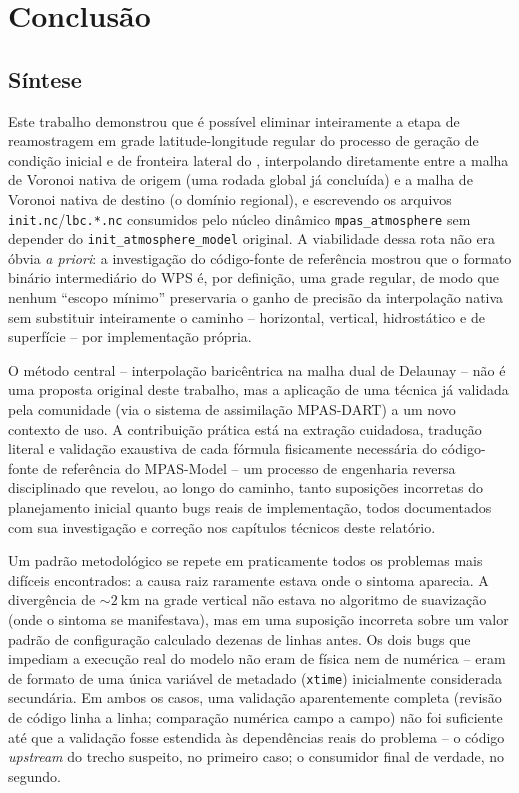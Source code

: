 \chapter{Conclusão}
\label{cap:conclusao}

\section{Síntese}

Este trabalho demonstrou que é possível eliminar inteiramente a etapa de
reamostragem em grade latitude-longitude regular do processo de geração
de condição inicial e de fronteira lateral do \mpasa{}, interpolando
diretamente entre a malha de Voronoi nativa de origem (uma rodada global
já concluída) e a malha de Voronoi nativa de destino (o domínio
regional), e escrevendo os arquivos \texttt{init.nc}/\texttt{lbc.*.nc}
consumidos pelo núcleo dinâmico \texttt{mpas\_atmosphere} sem depender do
\texttt{init\_atmosphere\_model} original. A viabilidade dessa rota não
era óbvia \emph{a priori}: a investigação do código-fonte de referência
mostrou que o formato binário intermediário do WPS é, por definição, uma
grade regular, de modo que nenhum ``escopo mínimo'' preservaria o ganho
de precisão da interpolação nativa sem substituir inteiramente o
caminho -- horizontal, vertical, hidrostático e de superfície -- por
implementação própria.

O método central -- interpolação baricêntrica na malha dual de Delaunay
-- não é uma proposta original deste trabalho, mas a aplicação de uma
técnica já validada pela comunidade (via o sistema de assimilação
MPAS-DART) a um novo contexto de uso. A contribuição prática está na
extração cuidadosa, tradução literal e validação exaustiva de cada
fórmula fisicamente necessária do código-fonte de referência do
MPAS-Model -- um processo de engenharia reversa disciplinado que revelou,
ao longo do caminho, tanto suposições incorretas do planejamento inicial
quanto bugs reais de implementação, todos documentados com sua
investigação e correção nos capítulos técnicos deste relatório.

Um padrão metodológico se repete em praticamente todos os problemas mais
difíceis encontrados: a causa raiz raramente estava onde o sintoma
aparecia. A divergência de $\sim\SI{2}{\kilo\metre}$ na grade vertical
não estava no algoritmo de suavização (onde o sintoma se manifestava),
mas em uma suposição incorreta sobre um valor padrão de configuração
calculado dezenas de linhas antes. Os dois bugs que impediam a execução
real do modelo não eram de física nem de numérica -- eram de formato de
uma única variável de metadado (\texttt{xtime}) inicialmente considerada
secundária. Em ambos os casos, uma validação aparentemente completa
(revisão de código linha a linha; comparação numérica campo a campo)
não foi suficiente até que a validação fosse estendida às dependências
reais do problema -- o código \emph{upstream} do trecho suspeito, no
primeiro caso; o consumidor final de verdade, no segundo.

